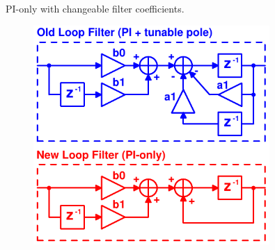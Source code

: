 \documentclass[t, screen, aspectratio=43]{beamer}
\begin{document}
\begin{frame}
\begin{block}{PI-only with changeable filter coefficients.}
\begin{minipage}{6cm}
		\end{minipage}%
		\begin{minipage}{6cm}
			\begin{figure}[htb!]
			        \centering
			        \includegraphics[width=0.8\textwidth, angle=0]{new_lf}
			\end{figure}
		\end{minipage}%

	\end{block}	
\end{frame}
\end{document}
